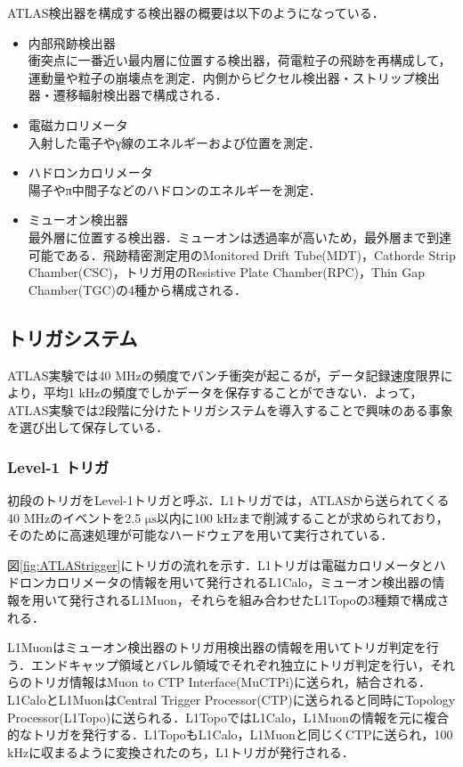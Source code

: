 ATLAS検出器を構成する検出器の概要は以下のようになっている．\par
\begin{itemize}
\item 内部飛跡検出器\\
衝突点に一番近い最内層に位置する検出器，荷電粒子の飛跡を再構成して，運動量や粒子の崩壊点を測定．内側からピクセル検出器・ストリップ検出器・遷移輻射検出器で構成される．
\item 電磁カロリメータ\\
入射した電子やγ線のエネルギーおよび位置を測定．
\item ハドロンカロリメータ\\
陽子やπ中間子などのハドロンのエネルギーを測定．
\item ミューオン検出器\\
最外層に位置する検出器．ミューオンは透過率が高いため，最外層まで到達可能である．飛跡精密測定用のMonitored Drift Tube(MDT)，Cathorde Strip Chamber(CSC)，トリガ用のResistive Plate Chamber(RPC)，Thin Gap Chamber(TGC)の4種から構成される．
\end{itemize}


\subsection{トリガシステム}
ATLAS実験では40 $\mathrm{MHz}$の頻度でバンチ衝突が起こるが，データ記録速度限界により，平均1 $\mathrm{kHz}$の頻度でしかデータを保存することができない．よって，ATLAS実験では2段階に分けたトリガシステムを導入することで興味のある事象を選び出して保存している．

\subsubsection*{Level-1 トリガ}
初段のトリガをLevel-1トリガと呼ぶ．L1トリガでは，ATLASから送られてくる40 $\mathrm{MHz}$のイベントを2.5 $\mathrm{\mu s}$以内に100 $\mathrm{kHz}$まで削減することが求められており，そのために高速処理が可能なハードウェアを用いて実行されている．\par
図\ref{fig:ATLAStrigger}にトリガの流れを示す．L1トリガは電磁カロリメータとハドロンカロリメータの情報を用いて発行されるL1Calo，ミューオン検出器の情報を用いて発行されるL1Muon，それらを組み合わせたL1Topoの3種類で構成される．\par
L1Muonはミューオン検出器のトリガ用検出器の情報を用いてトリガ判定を行う．エンドキャップ領域とバレル領域でそれぞれ独立にトリガ判定を行い，それらのトリガ情報はMuon to CTP Interface(MuCTPi)に送られ，結合される．L1CaloとL1MuonはCentral Trigger Processor(CTP)に送られると同時にTopology Processor(L1Topo)に送られる．L1TopoではL1Calo，L1Muonの情報を元に複合的なトリガを発行する．L1TopoもL1Calo，L1Muonと同じくCTPに送られ，100 $\mathrm{kHz}$に収まるように変換されたのち，L1トリガが発行される．

